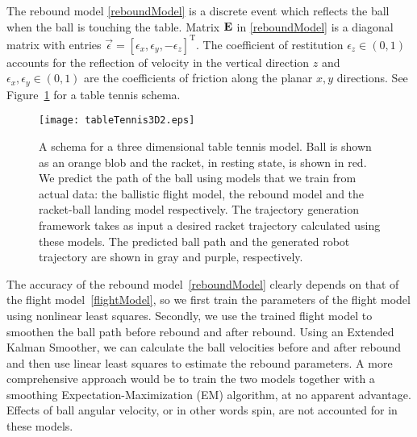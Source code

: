 \noindent The rebound model \eqref{reboundModel} is a discrete event which reflects the ball when the ball is touching the table. Matrix $\boldsymbol{\mathrm{E}}$ in \eqref{reboundModel} is a diagonal matrix with entries $\vec{\epsilon} = [\epsilon_{x}, \epsilon_{y}, -\epsilon_{z}]^{\mathrm{T}}$. The coefficient of restitution $\epsilon_{z} \in (0,1)$ accounts for the reflection of velocity in the vertical direction $z$ and $\epsilon_{x}, \epsilon_{y} \in (0,1)$ are the coefficients of friction along the planar $x,y$ directions. See Figure~\ref{models} for a table tennis schema. 

\begin{figure}[t!]
\centering
\texttt{[image: tableTennis3D2.eps]}			
\caption{A schema for a three dimensional table tennis model. Ball is shown as an orange blob and the racket, in resting state, is shown in red. We predict the path of the ball using models that we train from actual data: the ballistic flight model, the rebound model and the racket-ball landing model respectively. The trajectory generation framework takes as input a desired racket trajectory calculated using these models. The predicted ball path and the generated robot trajectory are shown in gray and purple, respectively.}
\label{models}
\end{figure}

The accuracy of the rebound model~\eqref{reboundModel} clearly depends on that of the flight model~\eqref{flightModel}, so we first train the parameters of the flight model using nonlinear least squares. Secondly, we use the trained flight model to smoothen the ball path before rebound and after rebound. Using an Extended Kalman Smoother, we can calculate the ball velocities before and after rebound and then use linear least squares to estimate the rebound parameters. A more comprehensive approach would be to train the two models together with a smoothing Expectation-Maximization (EM) algorithm, at no apparent advantage. %
Effects of ball angular velocity, or in other words spin, are not accounted for in these models.


